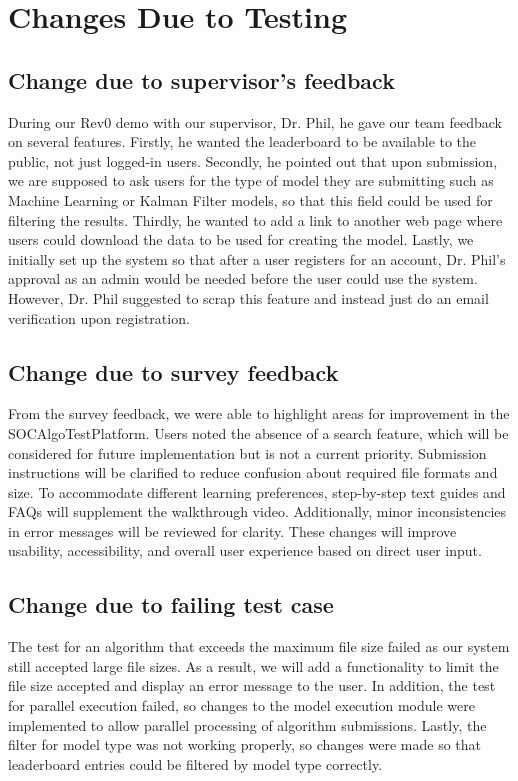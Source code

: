 \documentclass[12pt, titlepage]{article}
\begin{document}
\section{Changes Due to Testing}

\subsection{Change due to supervisor's feedback}
During our Rev0 demo with our supervisor, Dr. Phil, he gave our team feedback on several features. Firstly, he wanted the leaderboard to be available to the public, not just logged-in users. Secondly, he pointed out that upon submission, we are supposed to ask users for the type of model they are submitting such as Machine Learning or Kalman Filter models, so that this field could be used for filtering the results. Thirdly, he wanted to add a link to another web page where users could download the data to be used for creating the model. Lastly, we initially set up the system so that after a user registers for an account, Dr. Phil's approval as an admin would be needed before the user could use the system. However, Dr. Phil suggested to scrap this feature and instead just do an email verification upon registration.

\subsection{Change due to survey feedback}
From the survey feedback, we were able to highlight areas for improvement in the SOCAlgoTestPlatform. Users noted the absence of a search feature, which will be considered for future implementation but is not a current priority. Submission instructions will be clarified to reduce confusion about required file formats and size. To accommodate different learning preferences, step-by-step text guides and FAQs will supplement the walkthrough video. Additionally, minor inconsistencies in error messages will be reviewed for clarity. These changes will improve usability, accessibility, and overall user experience based on direct user input.

\subsection{Change due to failing test case}
The test for an algorithm that exceeds the maximum file size failed as our system still accepted large file sizes. As a result, we will add a functionality to limit the file size accepted and display an error message to the user. In addition, the test for parallel execution failed, so changes to the model execution module were implemented to allow parallel processing of algorithm submissions. Lastly, the filter for model type was not working properly, so changes were made so that leaderboard entries could be filtered by model type correctly.
\end{document}

